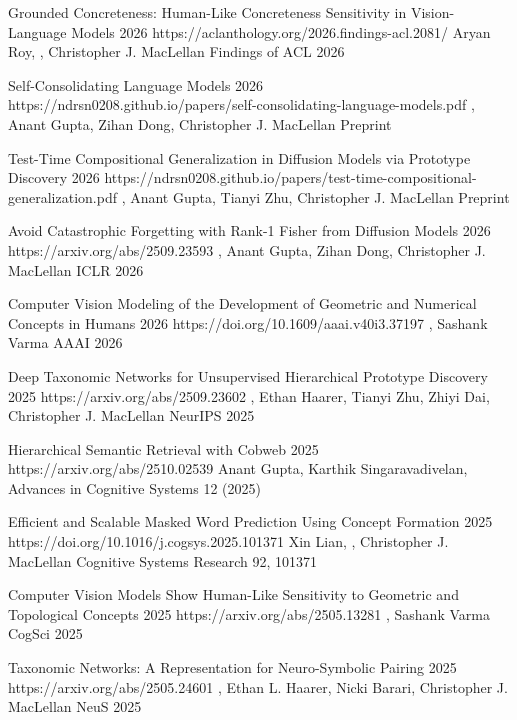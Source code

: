 \CVPublication
  {Grounded Concreteness: Human-Like Concreteness Sensitivity in Vision-Language Models}
  {2026}
  {https://aclanthology.org/2026.findings-acl.2081/}
  {Aryan Roy, \CVNameInAuthors, Christopher J. MacLellan}
  {Findings of ACL 2026}

\CVPublication
  {Self-Consolidating Language Models}
  {2026}
  {https://ndrsn0208.github.io/papers/self-consolidating-language-models.pdf}
  {\CVNameInAuthors\CVEqual, Anant Gupta\CVEqual, Zihan Dong, Christopher J. MacLellan}
  {Preprint}

\CVPublication
  {Test-Time Compositional Generalization in Diffusion Models via Prototype Discovery}
  {2026}
  {https://ndrsn0208.github.io/papers/test-time-compositional-generalization.pdf}
  {\CVNameInAuthors, Anant Gupta, Tianyi Zhu, Christopher J. MacLellan}
  {Preprint}

\CVPublication
  {Avoid Catastrophic Forgetting with Rank-1 Fisher from Diffusion Models}
  {2026}
  {https://arxiv.org/abs/2509.23593}
  {\CVNameInAuthors\CVEqual, Anant Gupta\CVEqual, Zihan Dong, Christopher J. MacLellan}
  {ICLR 2026}

\CVPublication
  {Computer Vision Modeling of the Development of Geometric and Numerical Concepts in Humans}
  {2026}
  {https://doi.org/10.1609/aaai.v40i3.37197}
  {\CVNameInAuthors, Sashank Varma}
  {AAAI 2026}

\CVPublication
  {Deep Taxonomic Networks for Unsupervised Hierarchical Prototype Discovery}
  {2025}
  {https://arxiv.org/abs/2509.23602}
  {\CVNameInAuthors, Ethan Haarer, Tianyi Zhu, Zhiyi Dai, Christopher J. MacLellan}
  {NeurIPS 2025}

\CVPublication
  {Hierarchical Semantic Retrieval with Cobweb}
  {2025}
  {https://arxiv.org/abs/2510.02539}
  {Anant Gupta\CVEqual, Karthik Singaravadivelan\CVEqual, \CVNameInAuthors}
  {Advances in Cognitive Systems 12 (2025)}

\CVPublication
  {Efficient and Scalable Masked Word Prediction Using Concept Formation}
  {2025}
  {https://doi.org/10.1016/j.cogsys.2025.101371}
  {Xin Lian\CVEqual, \CVNameInAuthors\CVEqual, Christopher J. MacLellan}
  {Cognitive Systems Research 92, 101371}

\CVPublication
  {Computer Vision Models Show Human-Like Sensitivity to Geometric and Topological Concepts}
  {2025}
  {https://arxiv.org/abs/2505.13281}
  {\CVNameInAuthors, Sashank Varma}
  {CogSci 2025}

\CVPublication
  {Taxonomic Networks: A Representation for Neuro-Symbolic Pairing}
  {2025}
  {https://arxiv.org/abs/2505.24601}
  {\CVNameInAuthors, Ethan L. Haarer, Nicki Barari, Christopher J. MacLellan}
  {NeuS 2025}

